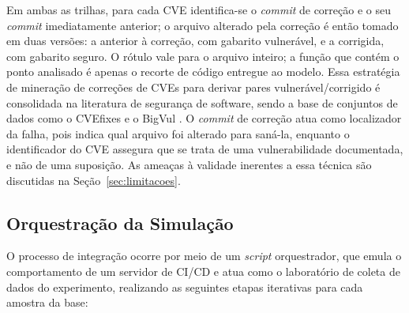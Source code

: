 Em ambas as trilhas, para cada CVE identifica-se o \textit{commit} de correção e o seu \textit{commit} imediatamente anterior; o arquivo alterado pela correção é então tomado em duas versões: a anterior à correção, com gabarito vulnerável, e a corrigida, com gabarito seguro. O rótulo vale para o arquivo inteiro; a função que contém o ponto analisado é apenas o recorte de código entregue ao modelo. Essa estratégia de mineração de correções de CVEs para derivar pares vulnerável/corrigido é consolidada na literatura de segurança de software, sendo a base de conjuntos de dados como o CVEfixes \cite{bhandari2021cvefixes} e o BigVul \cite{fan2020bigvul}. O \textit{commit} de correção atua como localizador da falha, pois indica qual arquivo foi alterado para saná-la, enquanto o identificador do CVE assegura que se trata de uma vulnerabilidade documentada, e não de uma suposição. As ameaças à validade inerentes a essa técnica são discutidas na Seção~\ref{sec:limitacoes}.

\subsection{Orquestração da Simulação}

O processo de integração ocorre por meio de um \textit{script} orquestrador, que emula o comportamento de um servidor de CI/CD e atua como o laboratório de coleta de dados do experimento, realizando as seguintes etapas iterativas para cada amostra da base:

